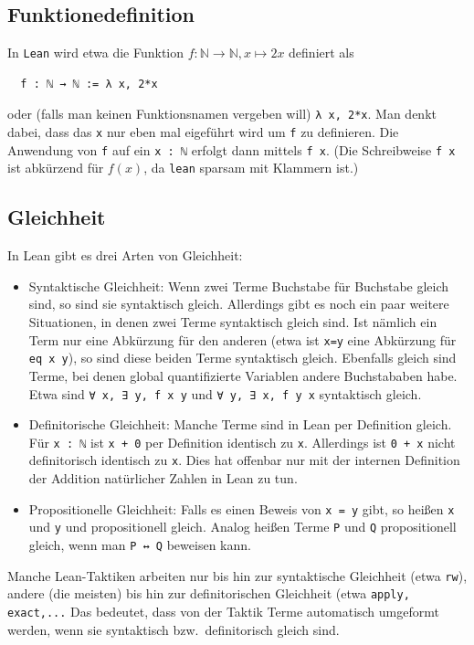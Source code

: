 \documentclass[11pt]{article}
\newcommand{\leanin}{\texttt}
\newcommand{\leanstate}{\texttt}
\begin{document}
\subsection{Funktionedefinition}
In \leanstate{Lean} wird etwa die Funktion $f : \mathbb N \to \mathbb N, x \mapsto 2x$ definiert als
\begin{verbatim}
  f : ℕ → ℕ := λ x, 2*x
\end{verbatim}
oder (falls man keinen Funktionsnamen vergeben will) \leanstate{λ x, 2*x}. Man denkt dabei, dass das \leanstate{x} nur eben mal eigeführt wird um \leanstate{f} zu definieren. Die Anwendung von \leanstate{f} auf ein \leanstate{x : ℕ} erfolgt dann mittels \leanstate{f x}. (Die Schreibweise \leanstate{f x} ist abkürzend für $f(x)$, da \leanstate{lean} sparsam mit Klammern ist.) 

\subsection{Gleichheit}
In Lean gibt es drei Arten von Gleichheit:
\begin{itemize}
\item Syntaktische Gleichheit: Wenn zwei Terme Buchstabe für Buchstabe gleich sind, so sind sie syntaktisch gleich. Allerdings gibt es noch ein paar weitere Situationen, in denen zwei Terme syntaktisch gleich sind. Ist nämlich ein Term nur eine Abkürzung für den anderen (etwa ist \leanstate{x=y} eine Abkürzung für \leanstate{eq x y}), so sind diese beiden Terme syntaktisch gleich. Ebenfalls gleich sind Terme, bei denen global quantifizierte Variablen andere Buchstababen habe. Etwa sind \leanstate{∀ x, ∃ y, f x y} und \leanstate{∀ y, ∃ x, f y x} syntaktisch gleich.
\item Definitorische Gleichheit: Manche Terme sind in Lean per Definition gleich. Für \leanstate{x : ℕ} ist \leanstate{x + 0} per Definition identisch zu \leanstate{x}. Allerdings ist  \leanstate{0 + x} nicht definitorisch identisch zu \leanstate{x}. Dies hat offenbar nur mit der internen Definition der Addition natürlicher Zahlen in Lean zu tun.
\item Propositionelle Gleichheit: Falls es einen Beweis von \leanstate{x = y} gibt, so heißen \leanstate{x} und \leanstate{y} und  propositionell gleich. Analog heißen Terme \leanstate{P} und  \leanstate{Q} propositionell gleich, wenn man \leanstate{P ↔ Q} beweisen kann. 
\end{itemize}
Manche Lean-Taktiken arbeiten nur bis hin zur syntaktische Gleichheit (etwa \leanin{rw}), andere (die meisten) bis hin zur definitorischen Gleichheit (etwa \leanin{apply, exact,...} Das bedeutet, dass von der Taktik Terme automatisch umgeformt werden, wenn sie syntaktisch bzw.\ definitorisch gleich sind.
\end{document}
